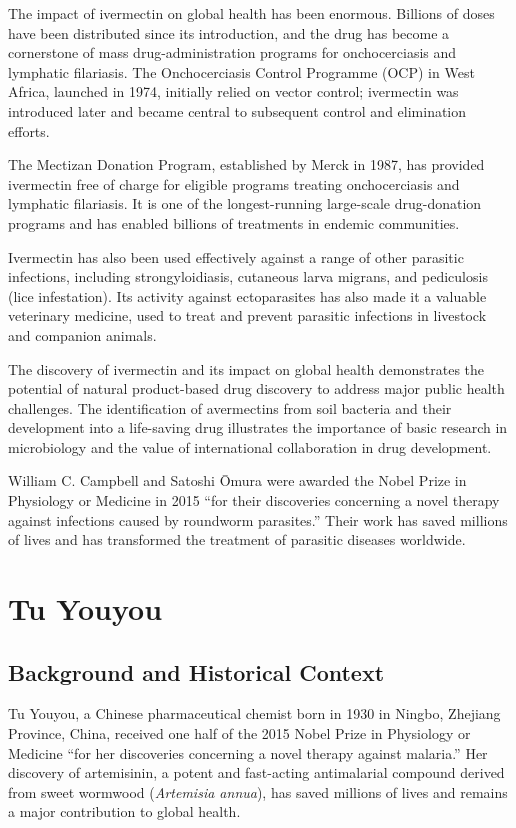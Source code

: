 The impact of ivermectin on global health has been enormous. Billions of doses have been distributed since its introduction, and the drug has become a cornerstone of mass drug-administration programs for onchocerciasis and lymphatic filariasis. The Onchocerciasis Control Programme (OCP) in West Africa, launched in 1974, initially relied on vector control; ivermectin was introduced later and became central to subsequent control and elimination efforts.

The Mectizan Donation Program, established by Merck in 1987, has provided ivermectin free of charge for eligible programs treating onchocerciasis and lymphatic filariasis. It is one of the longest-running large-scale drug-donation programs and has enabled billions of treatments in endemic communities.

Ivermectin has also been used effectively against a range of other parasitic infections, including strongyloidiasis, cutaneous larva migrans, and pediculosis (lice infestation). Its activity against ectoparasites has also made it a valuable veterinary medicine, used to treat and prevent parasitic infections in livestock and companion animals.

The discovery of ivermectin and its impact on global health demonstrates the potential of natural product-based drug discovery to address major public health challenges. The identification of avermectins from soil bacteria and their development into a life-saving drug illustrates the importance of basic research in microbiology and the value of international collaboration in drug development.

William C. Campbell and Satoshi \=Omura were awarded the Nobel Prize in Physiology or Medicine in 2015 ``for their discoveries concerning a novel therapy against infections caused by roundworm parasites.'' Their work has saved millions of lives and has transformed the treatment of parasitic diseases worldwide.

\section{Tu Youyou}

\subsection{Background and Historical Context}

Tu Youyou, a Chinese pharmaceutical chemist born in 1930 in Ningbo, Zhejiang Province, China, received one half of the 2015 Nobel Prize in Physiology or Medicine ``for her discoveries concerning a novel therapy against malaria.'' Her discovery of artemisinin, a potent and fast-acting antimalarial compound derived from sweet wormwood (\textit{Artemisia annua}), has saved millions of lives and remains a major contribution to global health.

